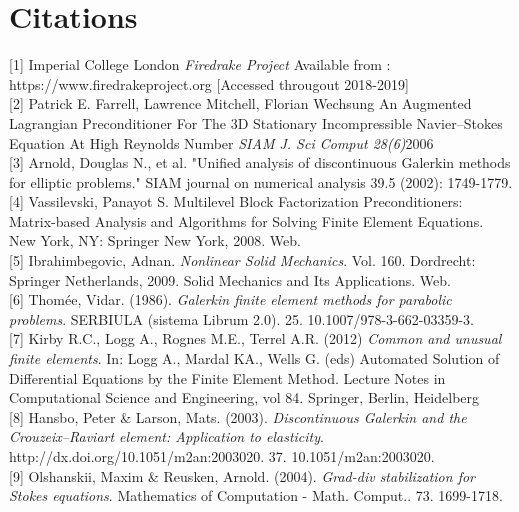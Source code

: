 \documentclass[11pt,twoside,a4paper]{article}
\begin{document}
\section{Citations}

[1] Imperial College London \textit{Firedrake Project} Available from : https://www.firedrakeproject.org [Accessed througout 2018-2019]\\

[2] Patrick E. Farrell, Lawrence Mitchell, Florian Wechsung
 An Augmented Lagrangian Preconditioner For The 3D Stationary Incompressible Navier–Stokes Equation At High Reynolds Number
\textit{SIAM J. Sci Comput 28(6)}2006\\

[3] Arnold, Douglas N., et al. "Unified analysis of discontinuous Galerkin methods for elliptic problems." SIAM journal on numerical analysis 39.5 (2002): 1749-1779.\\

[4] Vassilevski, Panayot S. Multilevel Block Factorization Preconditioners: Matrix-based Analysis and Algorithms for Solving Finite Element Equations. New York, NY: Springer New York, 2008. Web.\\

[5] Ibrahimbegovic, Adnan. \textit{Nonlinear Solid Mechanics}. Vol. 160. Dordrecht: Springer Netherlands, 2009. Solid Mechanics and Its Applications. Web.\\

[6] Thomée, Vidar. (1986). \textit{Galerkin finite element methods for parabolic problems}. SERBIULA (sistema Librum 2.0). 25. 10.1007/978-3-662-03359-3. \\

[7]  Kirby R.C., Logg A., Rognes M.E., Terrel A.R. (2012) \textit{Common and unusual finite elements}. In: Logg A., Mardal KA., Wells G. (eds) Automated Solution of Differential Equations by the Finite Element Method. Lecture Notes in Computational Science and Engineering, vol 84. Springer, Berlin, Heidelberg\\

[8] Hansbo, Peter \& Larson, Mats. (2003). \textit{Discontinuous Galerkin and the Crouzeix–Raviart element: Application to elasticity}. http://dx.doi.org/10.1051/m2an:2003020. 37. 10.1051/m2an:2003020. \\

[9] Olshanskii, Maxim \& Reusken, Arnold. (2004). \textit{Grad-div stabilization for Stokes equations}. Mathematics of Computation - Math. Comput.. 73. 1699-1718. \\
\end{document}
